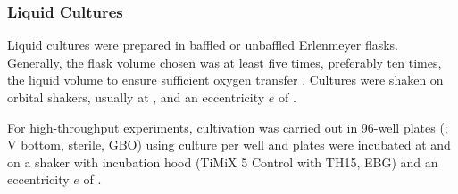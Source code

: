 \subsubsection{Liquid Cultures}
Liquid cultures were prepared in baffled or unbaffled Erlenmeyer flasks. Generally, the flask volume chosen was at least five times, preferably ten times, the liquid volume to ensure sufficient oxygen transfer \cite{Maier2001}. Cultures were shaken on orbital shakers, usually at ,  and an eccentricity $e$ of .

For high-throughput experiments, cultivation was carried out in 96-well plates (; V bottom, sterile, GBO) using  culture per well and plates were incubated at  and  on a shaker with incubation hood (TiMiX 5 Control with TH15, EBG) and an eccentricity $e$ of .

